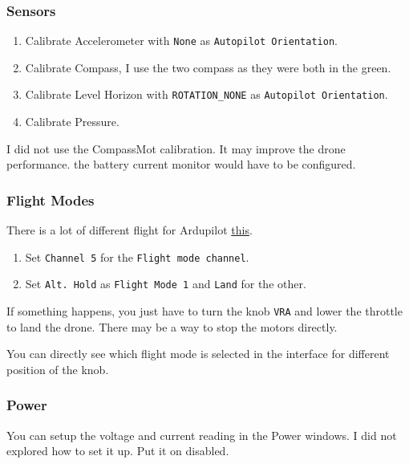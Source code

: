             \subsubsection{Sensors}
                \begin{enumerate}
                    \item Calibrate Accelerometer with \texttt{None} as \texttt{Autopilot Orientation}.
                    \item Calibrate Compass, I use the two compass as they were both in the green.
                    \item Calibrate Level Horizon  with \texttt{ROTATION\_NONE} as \texttt{Autopilot Orientation}.
                    \item Calibrate Pressure.
                \end{enumerate}
                I did not use the CompassMot calibration. It may improve the drone performance. the battery current monitor would have to be configured.
                
            \subsubsection{Flight Modes}
                There is a lot of different flight for Ardupilot \href{http://ardupilot.org/copter/docs/flight-modes.html}{this}.
                \begin{enumerate}
                    \item Set \texttt{Channel 5} for the \texttt{Flight mode channel}.
                    \item Set \texttt{Alt. Hold} as \texttt{Flight Mode 1} and \texttt{Land} for the other.
                \end{enumerate}
                If something happens, you just have to turn the knob \texttt{VRA} and lower the throttle to land the drone.
                There may be a way to stop the motors directly.
                
                You can directly see which flight mode is selected in the interface for different position of the knob.
                
            \subsubsection{Power}
                You can setup the voltage and current reading in the Power windows.
                I did not explored how to set it up. Put it on disabled.
                
